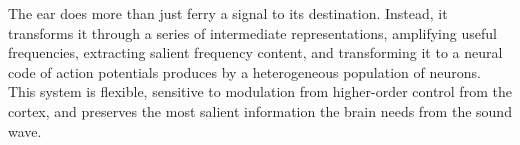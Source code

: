 \documentclass[11pt]{diazessay} %
\begin{document}
The ear does more than just ferry a signal to its destination.
Instead, it transforms it through a series of intermediate representations,
amplifying useful frequencies,
extracting salient frequency content,
and transforming it to a neural code of action potentials
produces by a heterogeneous population of neurons.
This system is flexible, sensitive to modulation from higher-order
control from the cortex,
and preserves the most salient information the brain needs
from the sound wave.



\end{document}
